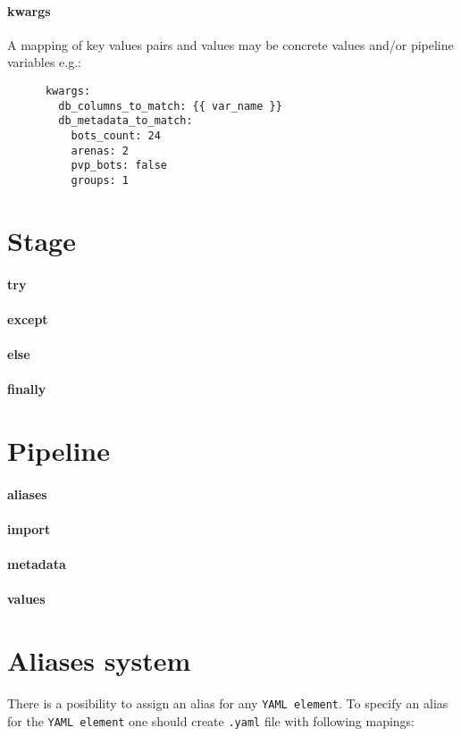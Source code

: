 \documentclass[14pt]{article}
\begin{document}
\begin{multicols}{2}
\paragraph{kwargs}
A mapping of key values pairs and values may be concrete values and/or pipeline variables e.g.:
\begin{verbatim}
      kwargs:
        db_columns_to_match: {{ var_name }}
        db_metadata_to_match:
          bots_count: 24
          arenas: 2
          pvp_bots: false
          groups: 1
\end{verbatim}

\section{Stage}\label{stage_info}
\paragraph{try}
\paragraph{except}
\paragraph{else}
\paragraph{finally}

\section{Pipeline}\label{pipeline_info}
\paragraph{aliases}
\paragraph{import}
\paragraph{metadata}
\paragraph{values}


\section{Aliases system}\label{aliases system}
There is a posibility to assign an alias for any \verb|YAML element|.
To specify an alias for the \verb|YAML element| one should create \verb|.yaml| file with following mapings:


\end{multicols}
\end{document}
